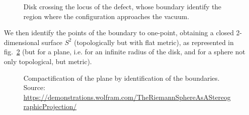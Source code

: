 \documentclass[../main/main.tex]{subfiles}
\begin{document}
\begin{figure}[h]
\caption{Disk crossing the locus of the defect, whose boundary identify the region where the configuration approaches the vacuum.}
\label{fig:disk-defect}
\end{figure}

We then identify the points of the boundary to one-point, obtaining a closed 2-dimensional surface $S^2$ (topologically but with flat metric), as represented in fig.~\ref{fig:compactification-Riemann-sphere} (but for a plane, i.e. for an infinite radius of the disk, and for a sphere not only topological, but metric). 

\begin{figure}[h]
\centering
\def\svgwidth{\columnwidth}
\caption{Compactification of the plane by identification of the boundaries. Source: \url{https://demonstrations.wolfram.com/TheRiemannSphereAsAStereographicProjection/}}
\label{fig:compactification-Riemann-sphere}
\end{figure}
\end{document}
